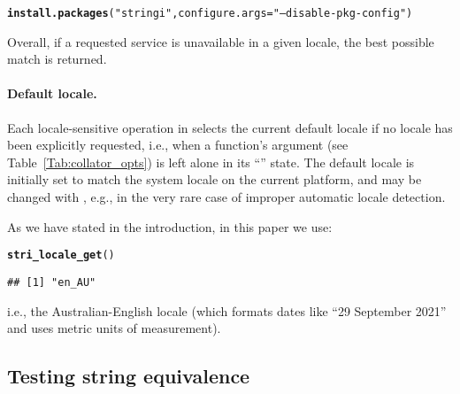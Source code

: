 \documentclass[nojss]{jss}\usepackage[]{graphicx}\usepackage[]{xcolor}
\makeatletter
\newcommand{\hlstr}[1]{\textcolor[rgb]{0.192,0.494,0.8}{#1}}%
\newcommand{\hlstd}[1]{\textcolor[rgb]{0.345,0.345,0.345}{#1}}%
\newcommand{\hlkwc}[1]{\textcolor[rgb]{0.333,0.667,0.333}{#1}}%
\newcommand{\hlkwd}[1]{\textcolor[rgb]{0.737,0.353,0.396}{\textbf{#1}}}%
\newenvironment{kframe}{%
 \def\at@end@of@kframe{}%
 \ifinner\ifhmode%
  \def\at@end@of@kframe{\end{minipage}}%
  \begin{minipage}{\columnwidth}%
 \fi\fi%
 \def\FrameCommand##1{\hskip\@totalleftmargin \hskip-\fboxsep
 \colorbox{shadecolor}{##1}\hskip-\fboxsep
     \hskip-\linewidth \hskip-\@totalleftmargin \hskip\columnwidth}%
 \MakeFramed {\advance\hsize-\width
   \@totalleftmargin\z@ \linewidth\hsize
   \@setminipage}}%
 {\par\unskip\endMakeFramed%
 \at@end@of@kframe}
\newenvironment{knitrout}{}{} %
\makeatother
\begin{document}
\begin{knitrout}
\color{fgcolor}\begin{kframe}
\begin{alltt}
\hlkwd{install.packages}\hlstd{(}\hlstr{"stringi"}\hlstd{,} \hlkwc{configure.args}\hlstd{=}\hlstr{"--disable-pkg-config"}\hlstd{)}
\end{alltt}
\end{kframe}
\end{knitrout}

Overall, if a requested service is unavailable
in a given locale, the best possible match is returned.


\paragraph{Default locale.}
Each locale-sensitive operation in  selects the current
default locale if no locale has been explicitly requested,
i.e., when a function's  argument (see Table~\ref{Tab:collator_opts})
is left alone in its ``'' state.
The default locale is initially set to match the system locale on the current
platform, and may be changed with , e.g.,
in the very rare case of improper automatic locale detection.

As we have stated in the introduction, in this paper we use:

\begin{knitrout}
\color{fgcolor}\begin{kframe}
\begin{alltt}
\hlkwd{stri_locale_get}\hlstd{()}
\end{alltt}
\begin{verbatim}
## [1] "en_AU"
\end{verbatim}
\end{kframe}
\end{knitrout}

\noindent
i.e., the Australian-English locale
(which formats dates like ``29 September 2021'' and
uses metric units of measurement).








\subsection{Testing string equivalence}\label{Sec:Equivalence}
\end{document}

